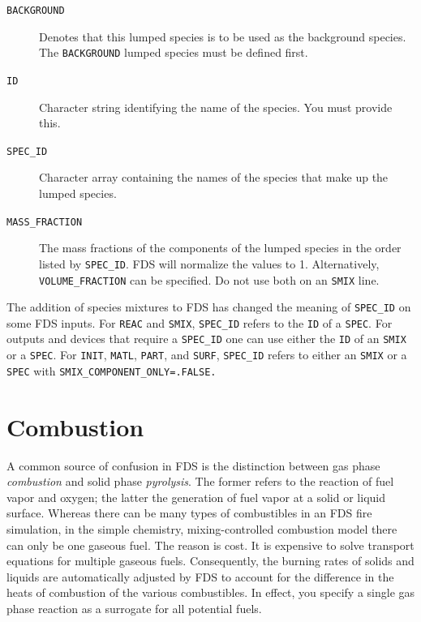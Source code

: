 \documentclass[11pt]{book}
\newcommand{\ct}{\tt\small}
\begin{document}
\begin{description}
\item[{\ct BACKGROUND}] Denotes that this lumped species is to be used as the background species.  The {\ct BACKGROUND} lumped species must be defined first.
\item[{\ct ID}] Character string identifying the name of the species. You must provide this.
\item[{\ct SPEC\_ID}] Character array containing the names of the species that make up the lumped species.
\item[{\ct MASS\_FRACTION}] The mass fractions of the components of the lumped species in the order listed by {\ct SPEC\_ID}.  FDS will normalize the values to 1. Alternatively, {\ct VOLUME\_FRACTION} can be specified. Do not use both on an {\ct SMIX} line.
\end{description}

\noindent The addition of species mixtures to FDS has changed the meaning of {\ct SPEC\_ID} on some FDS inputs.
For {\ct REAC} and {\ct SMIX}, {\ct SPEC\_ID} refers to the {\ct ID} of a {\ct SPEC}. For outputs and devices that require a
{\ct SPEC\_ID} one can use either the {\ct ID} of an {\ct SMIX} or a {\ct SPEC}.  For {\ct INIT}, {\ct MATL}, {\ct PART},
and {\ct SURF}, {\ct SPEC\_ID} refers to either an {\ct SMIX} or a {\ct SPEC} with {\ct SMIX\_COMPONENT\_ONLY=.FALSE.}





\chapter{Combustion}

\label{chap:combustion}
\label{info:REAC}

A common source of confusion in FDS is the distinction between gas phase {\em combustion} and solid phase {\em pyrolysis}. The former
refers to the reaction of fuel vapor and oxygen; the latter the generation of fuel vapor at a solid or liquid surface. Whereas there
can be many types of combustibles in an FDS fire simulation, in the simple chemistry, mixing-controlled combustion model there can only be one gaseous fuel. The reason is cost.
It is expensive to
solve transport equations for multiple gaseous fuels. Consequently, the burning rates of solids and liquids are automatically adjusted by
FDS to account for the difference in the heats of combustion of the various combustibles. In effect, you specify a single gas phase
reaction as a surrogate for all potential fuels.
\end{document}
